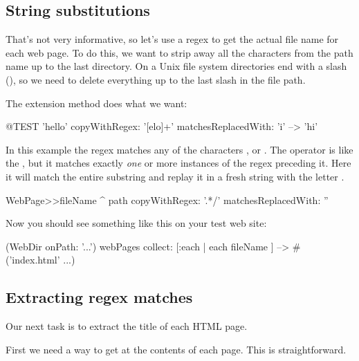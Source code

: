 \documentclass[a4paper,10pt,twoside]{book}
\begin{document}
\subsection{String substitutions}

That's not very informative, so let's use a regex to get the actual file name for each web page.
To do this, we want to strip away all the characters from the path name up to the last directory.
On a Unix file system directories end with a slash (\ct{/}), so we need to delete everything up to the last slash in the file path.

The  extension method  does what we want:

\begin{code}{@TEST}
'hello' copyWithRegex: '[elo]+' matchesReplacedWith: 'i' --> 'hi'
\end{code}

In this example the regex \ct{[elo]} matches any of the characters ,  or .
The operator \ct{+} is like the , but it matches exactly \emph{one} or more instances of the regex preceding it. Here it will match the entire substring  and replay it in a fresh string with the letter .


\begin{code}{}
WebPage>>fileName
	^ path copyWithRegex: '.*/' matchesReplacedWith: ''
\end{code}

Now you should see something like this on your test web site:

\begin{code}{}
(WebDir onPath: '...') webPages collect: [:each | each fileName ]
  --> #('index.html' ...)
\end{code}

\subsection{Extracting regex matches}

Our next task is to extract the title of each HTML page.

First we need a way to get at the contents of each page.  This is straightforward.
\end{document}
